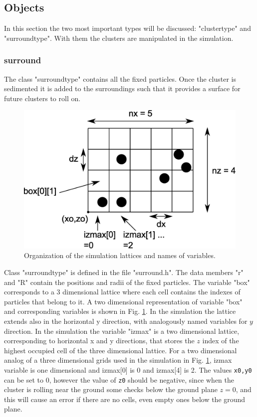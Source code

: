 \documentclass[12pt]{article}
\begin{document}
\subsection{Objects}
In this section the two most important types will be discussed: "clustertype" and "surroundtype". With them the clusters are manipulated in the simulation. 
\subsubsection{surround}
The class "surroundtype" contains all the fixed particles. Once the cluster is sedimented it is added to the surroundings such that it provides a surface for future clusters to roll on.
\begin{figure}[!htbh]
\includegraphics*[width=\columnwidth]{grid.eps}
\caption{Organization of the simulation lattices and names of variables.}
\label{lattice}
\end{figure}
Class "surroundtype" is defined in the file "surround.h". The data members "r" and "R" contain the positions and radii of the fixed particles. The variable "box" corresponds to a 3 dimensional lattice where each cell contains the indexes of particles that belong to it. A two dimensional representation of variable "box" and corresponding variables is shown in Fig. \ref{lattice}. In the simulation the lattice extends also in the horizontal y direction, with analogously named variables for $y$ direction. In the simulation the variable "izmax" is a two dimensional lattice, corresponding to horizontal x and y directions, that stores the $z$ index of the highest occupied cell of the three dimensional lattice. For a two dimensional analog of a three dimensional grids used in the simulation in Fig. \ref{lattice}, izmax variable is one dimensional and izmax[0] is 0 and izmax[4] is 2. The values \texttt{x0,y0} can be set to 0, however the value of \texttt{z0} should be negative, since when the cluster is rolling near the ground some checks below the ground plane $z=0$, and this will cause an error if there are no cells, even empty ones below the ground plane.
\end{document}
